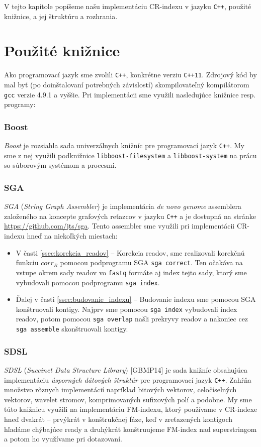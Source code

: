V tejto kapitole popíšeme našu implementáciu CR-indexu v jazyku \texttt{C++}, použité knižnice, a jej štruktúru a rozhrania.

\section{Použité knižnice}

Ako programovací jazyk sme zvolili \texttt{C++}, konkrétne verziu \texttt{C++11}. Zdrojový kód by mal byť (po doinštalovaní potrebných závislostí) skompilovateľný kompilátorom \texttt{gcc} verzie 4.9.1 a vyššie. Pri implementácii sme využili nasledujúce knižnice resp. programy:

\subsubsection{Boost}
\emph{Boost} je rozsiahla sada univerzálnych knižníc pre programovací jazyk \texttt{C++}. My sme z nej využili podknižnice \texttt{libboost-filesystem} a \texttt{libboost-system} na prácu so súborovým systémom a procesmi.

\subsubsection{SGA}
\emph{SGA} (\emph{String Graph Assembler}) \cite{SD11} je implementácia \emph{de novo genome} assemblera založeného na koncepte grafových reťazcov v jazyku \texttt{C++} a je dostupná na stránke \url{https://github.com/jts/sga}. Tento assembler sme využili pri implementácii CR-indexu hneď na niekoľkých miestach:

\begin{itemize}
\item V časti \ref{ssec:korekcia_readov} -- Korekcia readov, sme realizovali korekčnú funkciu $corr_R$ pomocou podprogramu SGA \texttt{sga correct}. Ten očakáva na vstupe okrem sady readov vo \texttt{fastq} formáte aj index tejto sady, ktorý sme vybudovali pomocou podprogramu \texttt{sga index}.
\item Ďalej v časti \ref{ssec:budovanie_indexu} -- Budovanie indexu sme pomocou SGA konštruovali kontigy. Najprv sme pomocou \texttt{sga index} vybudovali index readov, potom pomocou \texttt{sga overlap} našli prekryvy readov a nakoniec cez \texttt{sga assemble} skonštruovali kontigy.
\end{itemize}

\subsubsection{SDSL}
\emph{SDSL} (\emph{Succinct Data Structure Library}) [GBMP14] je sada knižníc obsahujúca implementáciu \emph{úsporných dátových štruktúr} pre programovací jazyk \texttt{C++}. Zahŕňa množstvo rôznych implementácií napríklad bitových vektorov, celočíselných vektorov, wavelet stromov, komprimovaných sufixových polí a podobne. My sme túto knižnicu využili na implementáciu FM-indexu, ktorý používame v CR-indexe hneď dvakrát -- prvýkrát v konštrukčnej fáze, keď v zreťazených kontigoch hľadáme chýbajúce ready a druhýkrát konštruujeme FM-index nad superstringom a potom ho využívame pri dotazovaní.

